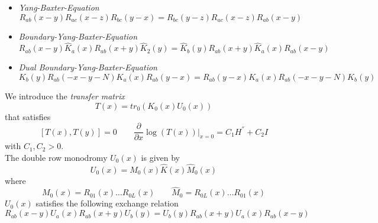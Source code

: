 \documentclass[10pt]{article}
\numberwithin{equation}{section}
\numberwithin{equation}{subsection}
\begin{document}
\begin{itemize}
	\item \textit{Yang-Baxter-Equation}
	\begin{equation}
		R_{ab}(x-y)R_{ac}(x-z)R_{bc}(y-x)=R_{bc}(y-z)R_{ac}(x-z)R_{ab}(x-y)
	\end{equation}
	\item \textit{Boundary-Yang-Baxter-Equation}
	\begin{equation}
		R_{ab}(x-y)\widehat{K}_{a}(x)R_{ab}(x+y)\widehat{K}_{2}(y)=\widehat{K}_{b}(y)R_{ab}(x+y)\widehat{K}_{a}(x)R_{ab}(x-y)
	\end{equation}
	\item \textit{Dual Boundary-Yang-Baxter-Equation}
	\begin{equation}
		K_{b}(y) R_{ab}(-x-y-N) K_{a}(x)R_{ab}(y-x)=R_{ab}(y-x)K_{a}(x)R_{ab}(-x-y-N)K_{b}(y)
	\end{equation}
\end{itemize}
We introduce the \textit{transfer matrix}
\begin{equation}
	T(x)=tr_{0}\left(K_{0}(x)U_{0}(x)\right)
\end{equation}
that satisfies
\begin{equation}
	\left[T(x),T(y)\right]=0\qquad \frac{\partial}{\partial x}\log (T(x))\lvert_{x=0}=C_{1}H^{''}+C_{2}I
\end{equation}
with $C_{1},C_{2}>0$. \\
The double row monodromy $U_{0}(x)$ is given by
\begin{equation}
	U_{0}(x)=M_{0}(x)\widehat{K}(x)\widehat{M}_{0}(x)
\end{equation}
where 
\begin{equation}
	M_{0}(x)=R_{01}(x)\ldots R_{0L}(x)\qquad \widehat{M}_{0}=R_{0L}(x)\ldots R_{01}(x)
\end{equation}
$U_{0}(x)$ satisfies the following exchange relation
\begin{equation}\label{RURU}
	R_{ab}(x-y)U_{a}(x)R_{ab}(x+y)U_{b}(y)=U_{b}(y)R_{ab}(x+y)U_{a}(x)R_{ab}(x-y)
\end{equation}
\end{document}
